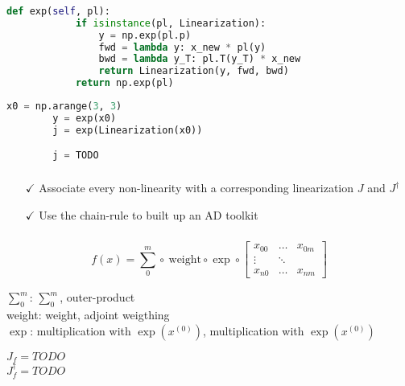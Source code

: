 \documentclass[aspectratio=169,xcolor=dvipsnames]{beamer}
\begin{document}
\begin{frame}[fragile]
	\frametitle{\insertsection}
	\framesubtitle{\insertsubsection}

	\begin{lstlisting}[language=python,escapechar=!]
		def exp(self, pl):
			if isinstance(pl, Linearization):
				y = np.exp(pl.p)
				fwd = lambda y: x_new * pl(y)
				bwd = lambda y_T: pl.T(y_T) * x_new
				return Linearization(y, fwd, bwd)
			return np.exp(pl)
	\end{lstlisting}

	\begin{lstlisting}[language=python,escapechar=!]
		x0 = np.arange(3, 3)
		y = exp(x0)
		j = exp(Linearization(x0))

		j = TODO
	\end{lstlisting}

\end{frame}

\begin{frame}
	\frametitle{\insertsection}
	\framesubtitle{\insertsubsection}

	\begin{enumerate}
		\item[$\checkmark$] Associate every non-linearity with a corresponding linearization $J$ and $J^\dagger$
		\item[$\checkmark$] Use the chain-rule to built up an AD toolkit
	\end{enumerate}

\end{frame}

\begin{frame}[fragile]
	\frametitle{\insertsection}
	\framesubtitle{\insertsubsection}

	\begin{equation*}
		f(x) =
		\sum_0^m
		\circ
		\ \text{weight}
		\circ
		\exp
		\circ
		\begin{bmatrix}
			x_{00} & \dots & x_{0m} \\
			\vdots & \ddots & \\
			x_{n0} & \dots & x_{nm}
		\end{bmatrix}
	\end{equation*}

	$\sum_0^m$: $\sum_0^m$, outer-product
	\\ weight: weight, adjoint weigthing
	\\ $\exp$: multiplication with $\exp(x^{(0)})$, multiplication with $\exp(x^{(0)})$

	\vspace{2em}

	$J_f = TODO$
	\\ $J_f^\dagger = TODO$

\end{frame}
\end{document}
